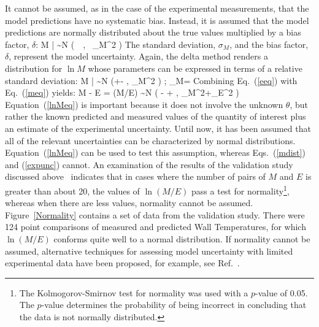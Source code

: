 It cannot be assumed, as in the case of the experimental measurements, that the model predictions have no systematic bias. Instead,
it is assumed that the model predictions are normally distributed about the true values
multiplied by a bias factor, $\delta$:
\be
   M \; | \; \theta \sim N \left(\delta \, \theta \, , \, \sigma_M^2 \right) \label{mdist}
\ee
The standard deviation, $\sigma_M$, and the bias factor, $\delta$, represent the model uncertainty.
Again, the delta method renders a distribution for $\ln M$ whose parameters can be expressed in terms of a
relative standard deviation:
\be
   \ln M \; | \; \theta \sim N \left(\ln \delta +\ln \theta -  \; , \;
   \widetilde{\sigma}_M^2 \right) \quad ; \quad \widetilde{\sigma}_M= \label{meq}
\ee
Combining Eq.~(\ref{eeq}) with Eq.~(\ref{meq}) yields:
\be
   \ln M  - \ln E = \ln(M/E) \sim N \left( \ln \delta - + \; ,
   \; \widetilde{\sigma}_M^2+\widetilde{\sigma}_E^2 \right) \label{lnMeq}
\ee
Equation~(\ref{lnMeq}) is important because it does not involve the unknown $\theta$, but rather the known predicted and measured values of the quantity
of interest plus an estimate of the experimental uncertainty. Until now, it has been assumed that all of the relevant uncertainties can be characterized
by normal distributions. Equation~(\ref{lnMeq}) can be used to test this assumption, whereas Eqs.~(\ref{mdist}) and (\ref{expunc}) cannot.
An examination of the results of the validation study discussed above~\cite{NUREG_1824}
indicates that in cases where the number of pairs of $M$ and $E$ is greater than about 20, the values of $\ln (M/E)$ pass a test for
normality\footnote{The Kolmogorov-Smirnov test for
normality was used with a $p$-value of 0.05. The $p$-value determines the probability of being incorrect in concluding that the data is not normally distributed.}, whereas when
there are less values, normality cannot be assumed. Figure~\ref{Normality} contains a set of data from the validation study.
There were 124 point comparisons of measured and predicted Wall Temperatures, for which $\ln (M/E)$ conforms quite well to a normal distribution.
If normality cannot be assumed, alternative techniques for assessing model uncertainty with limited
experimental data have been proposed, for example, see Ref.~\cite{Siu:1992}.
